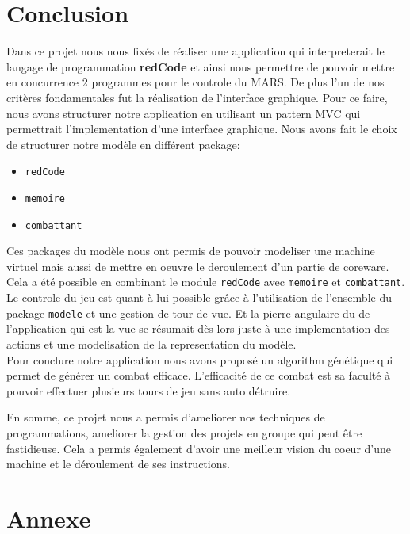 \documentclass[12pt]{article}
\newcommand{\packagename}[1]{\texttt{#1}}
\begin{document}
\section{Conclusion}
Dans ce projet nous nous fixés de réaliser une application qui interpreterait le langage de programmation \textbf{redCode} et ainsi nous permettre de pouvoir
mettre en concurrence 2 programmes pour le controle du MARS. De plus l'un de nos critères fondamentales fut la réalisation de l'interface
graphique. Pour ce faire, nous avons structurer notre application en utilisant un pattern MVC qui permettrait l'implementation d'une interface graphique. Nous avons
fait le choix de structurer notre modèle en différent package:
\begin{itemize}
	\item \packagename{redCode}
	\item \packagename{memoire}
	\item \packagename{combattant}
\end{itemize}
Ces packages du modèle nous ont permis de pouvoir modeliser une machine virtuel mais aussi de mettre en oeuvre le deroulement d'un partie
de coreware. Cela a été possible en combinant le module \packagename{redCode} avec \packagename{memoire} et \packagename{combattant}. Le controle du jeu
est quant à lui possible grâce à l'utilisation de l'ensemble du package \packagename{modele} et une gestion de tour de vue. Et la pierre angulaire du 
de l'application qui est la vue se résumait dès lors juste à une implementation des actions et une modelisation de la representation du modèle.\\

Pour conclure notre application nous avons proposé un algorithm génétique qui permet de générer un combat efficace. L'efficacité de ce combat est sa
faculté à pouvoir effectuer plusieurs tours de jeu sans auto détruire.

En somme, ce projet nous a permis d'ameliorer nos techniques de programmations, ameliorer la gestion des projets en groupe qui peut être fastidieuse.
Cela a permis également d'avoir une meilleur vision du coeur d'une machine et le déroulement de ses instructions.

\newpage

\nocite{*}


\newpage
\section*{Annexe}
\end{document}
